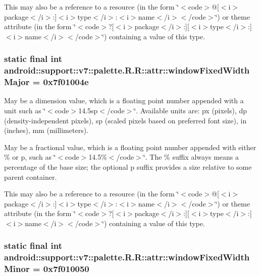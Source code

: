 This may also be a reference to a resource (in the form \char`\"{}$<$code$>$@\mbox{[}$<$i$>$package$<$/i$>$:\mbox{]}$<$i$>$type$<$/i$>$:$<$i$>$name$<$/i$>$$<$/code$>$\char`\"{}) or theme attribute (in the form \char`\"{}$<$code$>$?\mbox{[}$<$i$>$package$<$/i$>$:\mbox{]}\mbox{[}$<$i$>$type$<$/i$>$:\mbox{]}$<$i$>$name$<$/i$>$$<$/code$>$\char`\"{}) containing a value of this type. \hypertarget{classandroid_1_1support_1_1v7_1_1palette_1_1_r_1_1attr_1127690ade65f3c76ef35dd2fc42eeaa}{
\subsubsection[{windowFixedWidthMajor}]{\setlength{\rightskip}{0pt plus 5cm}static final int android::support::v7::palette.R.R::attr::windowFixedWidthMajor = 0x7f01004e}}
\label{classandroid_1_1support_1_1v7_1_1palette_1_1_r_1_1attr_1127690ade65f3c76ef35dd2fc42eeaa}


May be a dimension value, which is a floating point number appended with a unit such as \char`\"{}$<$code$>$14.5sp$<$/code$>$\char`\"{}. Available units are: px (pixels), dp (density-independent pixels), sp (scaled pixels based on preferred font size), in (inches), mm (millimeters). 

May be a fractional value, which is a floating point number appended with either \% or p, such as \char`\"{}$<$code$>$14.5\%$<$/code$>$\char`\"{}. The \% suffix always means a percentage of the base size; the optional p suffix provides a size relative to some parent container. 

This may also be a reference to a resource (in the form \char`\"{}$<$code$>$@\mbox{[}$<$i$>$package$<$/i$>$:\mbox{]}$<$i$>$type$<$/i$>$:$<$i$>$name$<$/i$>$$<$/code$>$\char`\"{}) or theme attribute (in the form \char`\"{}$<$code$>$?\mbox{[}$<$i$>$package$<$/i$>$:\mbox{]}\mbox{[}$<$i$>$type$<$/i$>$:\mbox{]}$<$i$>$name$<$/i$>$$<$/code$>$\char`\"{}) containing a value of this type. \hypertarget{classandroid_1_1support_1_1v7_1_1palette_1_1_r_1_1attr_28ff719fc1be6af767d9bbdfff98f332}{
\subsubsection[{windowFixedWidthMinor}]{\setlength{\rightskip}{0pt plus 5cm}static final int android::support::v7::palette.R.R::attr::windowFixedWidthMinor = 0x7f010050}}
\label{classandroid_1_1support_1_1v7_1_1palette_1_1_r_1_1attr_28ff719fc1be6af767d9bbdfff98f332}


